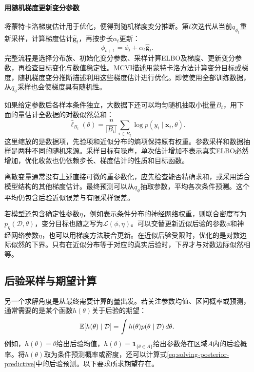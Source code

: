 \paragraph{用随机梯度更新变分参数}
将蒙特卡洛梯度估计用于优化，便得到随机梯度变分推断。第$t$次迭代从当前$q_{\phi_t}$重新采样，计算梯度估计$\widehat{\bm g}_t$，再按步长$\alpha_t$更新：
\begin{equation}
 \phi_{t+1}=\phi_t+\alpha_t\widehat{\bm g}_t.
\end{equation}
完整流程是选择分布族、初始化变分参数、采样计算ELBO及梯度、更新变分参数，再检查目标变化与数值稳定性。MCVI描述用蒙特卡洛方法计算变分目标或梯度，随机梯度变分推断描述利用这些梯度估计进行优化。即使使用全部训练数据，从$q_\phi$采样也会使梯度具有随机性。

如果给定参数后各样本条件独立，大数据下还可以均匀随机抽取小批量$B_t$，用下面的量估计全数据的对数似然总和：
\begin{equation}
 \widehat\ell_{B_t}(\theta)
 =\frac{n}{|B_t|}\sum_{i\in B_t}\log p(y_i\mid\bm x_i,\theta).
\end{equation}
这里缩放的是数据项，先验项和近似分布的熵项保持原有权重。参数采样和数据抽样是两种不同的随机来源。采样目标有噪声，单次估计增加不表示真实ELBO必然增加，优化收敛也仍依赖步长、梯度估计的性质和目标函数。

离散变量通常没有上述直接可微的重参数化，应先检查能否精确求和，或采用适合模型结构的其他梯度估计。最终预测可以从$q_\phi$抽取参数，平均各次条件预测。这个平均仍包含后验近似误差与有限采样误差。

若模型还包含确定性参数$\eta$，例如表示条件分布的神经网络权重，则联合密度写为$p_\eta(\mathcal D,\theta)$，变分目标也随之写为$\mathcal L(\phi,\eta)$。可以交替更新近似后验的参数$\phi$和神经网络参数$\eta$，也可以用梯度方法联合更新。在近似后验受限时，优化的是对数边际似然的下界。只有在近似分布等于对应的真实后验时，下界才与对数边际似然相等。

\subsection{后验采样与期望计算}
另一个求解角度是从最终需要计算的量出发。若关注参数均值、区间概率或预测，通常需要的是某个函数$h(\theta)$关于后验的期望：
\begin{equation}
 \mathbb{E}[h(\theta)\mid\mathcal D]
 =\int h(\theta)p(\theta\mid\mathcal D)\,d\theta.
\end{equation}
例如，$h(\theta)=\theta$给出后验均值，$h(\theta)=\mathbf 1_{\{\theta\in A\}}$给出参数落在区域$A$内的后验概率。将$h(\theta)$取为条件预测概率或密度，还可以计算式\eqref{eq:solving-posterior-predictive}中的后验预测。以下要求所求期望存在。

